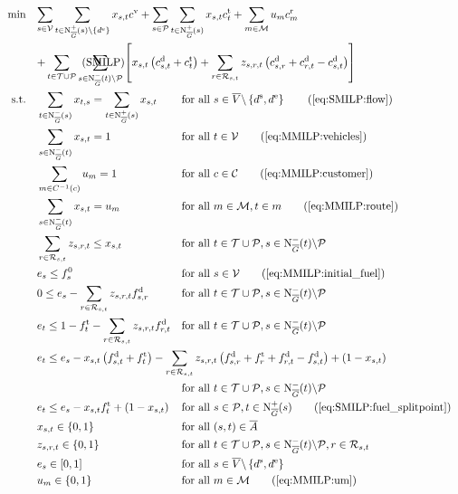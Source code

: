 \begin{align}
	\min \quad & \omit\rlap{$\displaystyle{\sum_{s\in\mathcal{V}} \sum_{t\in\Nouto(s)\backslash\{d^{\operatorname{e}}\}} x_{s,t}\cv + \sum_{s\in \mathcal{P}}\sum_{t\in\Nouto(s)} x_{s,t} \ct_t + \sum_{m\in\mathcal{M}} u_m \croute_m}$} \nonumber \\
	& \omit\rlap{$\displaystyle{ + \sum_{t\in\mathcal{T}\cup \mathcal{P}} \sum_{s\in\Nino(t)\backslash \mathcal{P}} \left[x_{s,t}\left(\cd_{s,t}+\ct_t\right) + \sum_{r\in\Rst} z_{s,r,t}\left(\cd_{s,r}+\cd_{r,t}-\cd_{s,t}\right)\right]}$} \tag{$\operatorname{SMILP}$} \label{eq:SMILP} \\
	\text{s.t.} \quad & \sum_{t\in\Nino(s)} x_{t,s} = \sum_{t\in\Nouto(s)} x_{s,t} & & \text{for all } s\in \overline{V}\backslash\left\{d^{\operatorname{s}},d^{\operatorname{e}}\right\} \tag{\ref{eq:SMILP:flow}} \\
	& \sum_{s\in\Nino(t)} x_{s,t} = 1 & & \text{for all } t\in\mathcal{V} \tag{\ref{eq:MMILP:vehicles}} \\
	& \sum_{m\in C^{-1}(c)} u_m = 1 && \text{for all } c\in\mathcal{C} \tag{\ref{eq:MMILP:customer}} \\
	& \sum_{s\in\Nino(t)} x_{s,t} = u_m && \text{for all } m\in\mathcal{M},t\in m \tag{\ref{eq:MMILP:route}} \\
	& \sum_{r\in\Rst} z_{s,r,t} \leq x_{s,t} & & \text{for all } t\in\mathcal{T}\cup \mathcal{P}, s\in\Nino(t)\backslash \mathcal{P} \label{eq:SMILP:refuel} \\
	& e_s \leq f_s^0 & & \text{for all } s\in\mathcal{V} \tag{\ref{eq:MMILP:initial_fuel}} \\
	& 0 \leq e_s - \sum_{r\in\Rst} z_{s,r,t}\fd_{s,r} & & \text{for all } t\in\mathcal{T}\cup \mathcal{P}, s\in\Nino(t)\backslash \mathcal{P} \label{eq:SMILP:min_fuel} \\
	& e_t \leq 1 - \ft_t - \sum_{r\in\Rst} z_{s,r,t}\fd_{r,t} & & \text{for all } t\in\mathcal{T}\cup \mathcal{P}, s\in\Nino(t)\backslash \mathcal{P} \label{eq:SMILP:max_fuel} \\
	& \omit\rlap{$\displaystyle{e_t \leq e_s - x_{s,t}\left(f_{s,t}^{\operatorname{d}}+f_t^{\operatorname{t}}\right) - \sum_{r\in\Rst} z_{s,r,t}\left(\fd_{s,r}+\ft_r+\fd_{r,t}-\fd_{s,t}\right) + \left(1-x_{s,t}\right)}$} \nonumber \\
	& & & \text{for all } t\in\mathcal{T}\cup \mathcal{P}, s\in\Nino(t)\backslash \mathcal{P} \label{eq:SMILP:fuel_consumption} \\
	& e_t \leq e_s-x_{s,t}\ft_t+\left(1-x_{s,t}\right) && \text{for all } s\in \mathcal{P},t\in\Nouto(s) \tag{\ref{eq:SMILP:fuel_splitpoint}} \\
	& x_{s,t}\in\{0,1\} & & \text{for all } (s,t)\in\overline{A} \\
	& z_{s,r,t}\in\{0,1\} & & \text{for all } t\in\mathcal{T}\cup \mathcal{P},s\in\Nino(t)\backslash \mathcal{P},r\in\Rst \\
	& e_s\in[0,1] & & \text{for all } s\in\overline{V}\backslash\left\{d^{\operatorname{s}},d^{\operatorname{e}}\right\} \\
	& u_m \in\{0,1\} && \text{for all } m\in\mathcal{M} \tag{\ref{eq:MMILP:um}}
\end{align}
